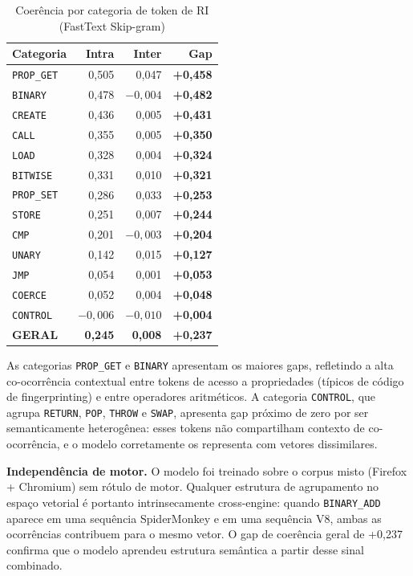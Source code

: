 \begin{table}[htb]
\centering
\caption{Coerência por categoria de token de RI (FastText Skip-gram)}
\label{tab:coerencia}
\begin{tabular}{lrrr}
\toprule
\textbf{Categoria} & \textbf{Intra} & \textbf{Inter} & \textbf{Gap} \\
\midrule
\texttt{PROP\_GET} & 0,505 &  0,047 & \textbf{+0,458} \\
\texttt{BINARY}    & 0,478 & $-0{,}004$ & \textbf{+0,482} \\
\texttt{CREATE}    & 0,436 &  0,005 & \textbf{+0,431} \\
\texttt{CALL}      & 0,355 &  0,005 & \textbf{+0,350} \\
\texttt{LOAD}      & 0,328 &  0,004 & \textbf{+0,324} \\
\texttt{BITWISE}   & 0,331 &  0,010 & \textbf{+0,321} \\
\texttt{PROP\_SET} & 0,286 &  0,033 & \textbf{+0,253} \\
\texttt{STORE}     & 0,251 &  0,007 & \textbf{+0,244} \\
\texttt{CMP}       & 0,201 & $-0{,}003$ & \textbf{+0,204} \\
\texttt{UNARY}     & 0,142 &  0,015 & \textbf{+0,127} \\
\texttt{JMP}       & 0,054 &  0,001 & \textbf{+0,053} \\
\texttt{COERCE}    & 0,052 &  0,004 & \textbf{+0,048} \\
\texttt{CONTROL}   & $-0{,}006$ & $-0{,}010$ & \textbf{+0,004} \\
\midrule
\textbf{GERAL}     & \textbf{0,245} & \textbf{0,008} & \textbf{+0,237} \\
\bottomrule
\end{tabular}

\end{table}

As categorias \texttt{PROP\_GET} e \texttt{BINARY} apresentam os maiores
gaps, refletindo a alta co-ocorrência contextual entre tokens de acesso a
propriedades (típicos de código de fingerprinting) e entre operadores
aritméticos. A categoria \texttt{CONTROL}, que agrupa \texttt{RETURN},
\texttt{POP}, \texttt{THROW} e \texttt{SWAP}, apresenta gap próximo de
zero por ser semanticamente heterogênea: esses tokens não compartilham contexto de
co-ocorrência, e o modelo corretamente os representa com vetores dissimilares.

\textbf{Independência de motor.} O modelo foi treinado sobre o corpus misto
(Firefox + Chromium) sem rótulo de motor. Qualquer estrutura de agrupamento no
espaço vetorial é portanto intrinsecamente cross-engine: quando \texttt{BINARY\_ADD}
aparece em uma sequência SpiderMonkey e em uma sequência V8, ambas as ocorrências
contribuem para o mesmo vetor. O gap de coerência geral de +0,237 confirma
que o modelo aprendeu estrutura semântica a partir desse sinal combinado.
